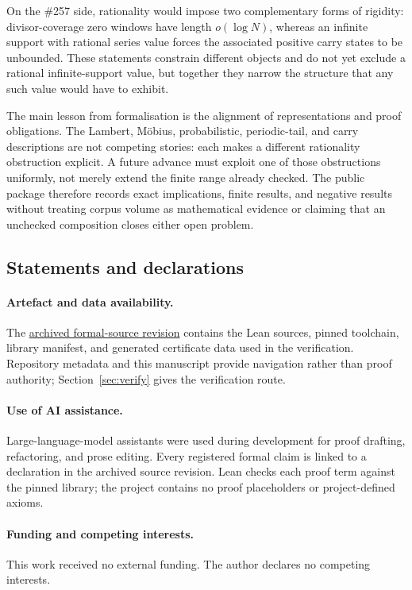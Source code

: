 \documentclass[11pt]{article}
\newcommand{\commit}{81150c1c6fdd4cd51e76d3aa0de344341e0e9e7c}
\newcommand{\sourceurl}{https://github.com/wcook04/plectis-lean-erdos249-257/tree/\commit}
\theoremstyle{definition}
\theoremstyle{remark}
\begin{document}
On the \#257 side, rationality would impose two complementary forms of
rigidity: divisor-coverage zero windows have length $o(\log N)$, whereas an
infinite support with rational series value forces the associated positive
carry states to be unbounded.
These statements constrain different objects and do not yet exclude a rational
infinite-support value, but together they narrow the structure that any such
value would have to exhibit.

The main lesson from formalisation is the alignment of representations and
proof obligations. The Lambert, M\"obius, probabilistic, periodic-tail, and
carry descriptions are not competing stories: each makes a different
rationality obstruction explicit. A future advance must exploit one of those
obstructions uniformly, not merely extend the finite range already checked.
The public package therefore records exact implications, finite results, and
negative results without treating corpus volume as mathematical evidence or
claiming that an unchecked composition closes either open problem.

\subsection*{Statements and declarations}

\paragraph{Artefact and data availability.} The
\href{\sourceurl}{archived formal-source revision} contains the Lean sources,
pinned toolchain, library manifest, and generated certificate data used in the
verification. Repository metadata and this manuscript provide navigation
rather than proof authority; Section~\ref{sec:verify} gives the verification
route.

\paragraph{Use of AI assistance.} Large-language-model assistants were used
during development for proof drafting, refactoring, and prose editing. Every
registered formal claim is linked to a declaration in the archived source
revision. Lean checks each proof term against the pinned library; the project
contains no proof placeholders or project-defined axioms.

\paragraph{Funding and competing interests.} This work received no external
funding. The author declares no competing interests.
\end{document}

